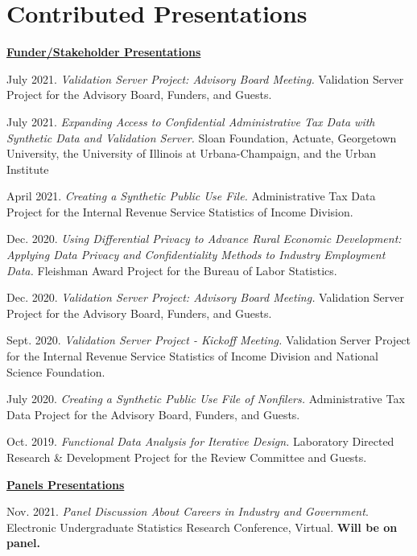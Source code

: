 \documentclass[11pt, letterpaper, roman]{moderncv} %
\begin{document}
\section{Contributed Presentations}
\underline{\textbf{\large Funder/Stakeholder Presentations}}\normalsize
\vspace{4pt}
\begin{etaremune}[topsep=0pt, itemsep=5pt, partopsep=0pt, parsep=0pt]
    \item July 2021. \textit{Validation Server Project: Advisory Board Meeting.} Validation Server Project for the Advisory Board, Funders, and Guests.
    
    \item July 2021. \textit{Expanding Access to Confidential Administrative Tax Data with Synthetic Data and Validation Server.} Sloan Foundation, Actuate, Georgetown University, the University of Illinois at Urbana-Champaign, and the Urban Institute
    
    \item April 2021. \textit{Creating a Synthetic Public Use File.} Administrative Tax Data Project for the Internal Revenue Service Statistics of Income Division.

    \item Dec. 2020. \textit{Using Differential Privacy to Advance Rural Economic Development: Applying Data Privacy and Confidentiality Methods to Industry Employment Data.} Fleishman Award Project for the Bureau of Labor Statistics.
    
    \item Dec. 2020. \textit{Validation Server Project: Advisory Board Meeting.} Validation Server Project for the Advisory Board, Funders, and Guests.
    
    \item Sept. 2020. \textit{Validation Server Project - Kickoff Meeting.} Validation Server Project for the Internal Revenue Service Statistics of Income Division and National Science Foundation.
    
    \item July 2020. \textit{Creating a Synthetic Public Use File of Nonfilers.} Administrative Tax Data Project for the Advisory Board, Funders, and Guests.
    
    \item Oct. 2019. \textit{Functional Data Analysis for Iterative Design.} Laboratory Directed Research \& Development Project for the Review Committee and Guests.

\newpage
\hspace{-0.30in}\underline{\textbf{\large Panels Presentations}}\normalsize
    \item Nov. 2021. \textit{Panel Discussion About Careers in Industry and Government}. Electronic Undergraduate Statistics Research Conference, Virtual. \textbf{Will be on panel.}


\end{etaremune}
\end{document}
